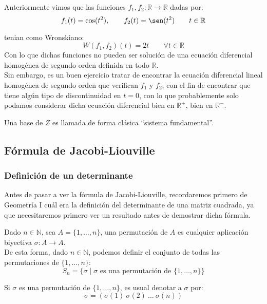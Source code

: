 \begin{ejemplo}
    Anteriormente vimos que las funciones $f_1,f_2:\mathbb{R}\rightarrow\mathbb{R}$ dadas por:
    \begin{equation*}
        f_1(t) = \cos(t^2), \qquad f_2(t) = \sen(t^2) \qquad t\in \mathbb{R}
    \end{equation*}

    tenian como Wronskiano:
    \begin{equation*}
        W(f_1,f_2)(t) = 2t \qquad \forall t\in \mathbb{R}
    \end{equation*}
    Con lo que dichas funciones no pueden ser solución de una ecuación diferencial homogénea de segundo orden definida en todo $\mathbb{R}$.\\

    Sin embargo, es un buen ejercicio tratar de encontrar la ecuación diferencial lineal homogénea de segundo orden que verifican $f_1$ y $f_2$, con el fin de encontrar que tiene algún tipo de discontinuidad en $t=0$, con lo que probablemente solo podamos considerar dicha ecuación diferencial bien en $\mathbb{R}^+$, bien en $\mathbb{R}^-$.
\end{ejemplo}

\begin{definicion}
    Una base de $Z$ es llamada de forma clásica ``sistema fundamental''.
\end{definicion}

\subsection{Fórmula de Jacobi-Liouville}
\subsubsection{Definición de un determinante}
Antes de pasar a ver la fórmula de Jacobi-Liouville, recordaremos primero de Geometría I cuál era la definición del determinante de una matriz cuadrada, ya que necesitaremos primero ver un resultado antes de demostrar dicha fórmula.
\begin{definicion}[Permutación]
    Dado $n\in \mathbb{N}$, sea $A=\{1,\ldots,n\}$, una permutación de $A$ es cualquier aplicación biyectiva $\sigma:A\rightarrow A$.\\

    De esta forma, dado $n\in \mathbb{N}$, podemos definir el conjunto de todas las permutaciones de $\{1,\ldots,n\}$:
    \begin{equation*}
        S_n = \{\sigma \mid \sigma \text{\ es una permutación de\ } \{1,\ldots,n\}\}
    \end{equation*}
\end{definicion}
\begin{notacion}
Si $\sigma$ es una permutación de $\{1,\ldots,n\}$, es usual denotar a $\sigma$ por:
\begin{equation*}
    \sigma = (\sigma(1)\ \sigma(2)\ \ldots\ \sigma(n))
\end{equation*}
    
\end{notacion}

